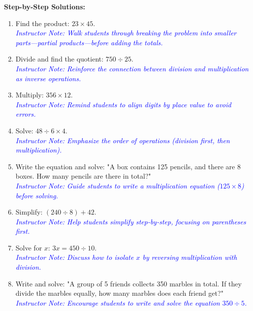 \documentclass[12pt]{article}
\begin{document}
\begin{tcolorbox}[colframe=black!60, colback=white, 
coltitle=black, colbacktitle=black!15, fonttitle=\bfseries\Large, 
title=Exercises, halign title=center, left=10pt, right=10pt, top=10pt, bottom=60pt]
\textbf{Step-by-Step Solutions:}
\begin{enumerate}[itemsep=3em]
    \item Find the product: \( 23 \times 45 \). \\
    \textcolor{blue}{\textit{Instructor Note: Walk students through breaking the problem into smaller parts—partial products—before adding the totals.}}

    \item Divide and find the quotient: \( 750 \div 25 \). \\
    \textcolor{blue}{\textit{Instructor Note: Reinforce the connection between division and multiplication as inverse operations.}}

    \item Multiply: \( 356 \times 12 \). \\
    \textcolor{blue}{\textit{Instructor Note: Remind students to align digits by place value to avoid errors.}}

    \item Solve: \( 48 \div 6 \times 4 \). \\
    \textcolor{blue}{\textit{Instructor Note: Emphasize the order of operations (division first, then multiplication).}}

    \item Write the equation and solve: "A box contains 125 pencils, and there are 8 boxes. How many pencils are there in total?" \\
    \textcolor{blue}{\textit{Instructor Note: Guide students to write a multiplication equation (\( 125 \times 8 \)) before solving.}}

    \item Simplify: \( (240 \div 8) + 42 \). \\
    \textcolor{blue}{\textit{Instructor Note: Help students simplify step-by-step, focusing on parentheses first.}}

    \item Solve for \( x \): \( 3x = 450 \div 10 \). \\
    \textcolor{blue}{\textit{Instructor Note: Discuss how to isolate \( x \) by reversing multiplication with division.}}

    \item Write and solve: "A group of 5 friends collects 350 marbles in total. If they divide the marbles equally, how many marbles does each friend get?" \\
    \textcolor{blue}{\textit{Instructor Note: Encourage students to write and solve the equation \( 350 \div 5 \).}}
\end{enumerate}
\end{tcolorbox}
\end{document}
